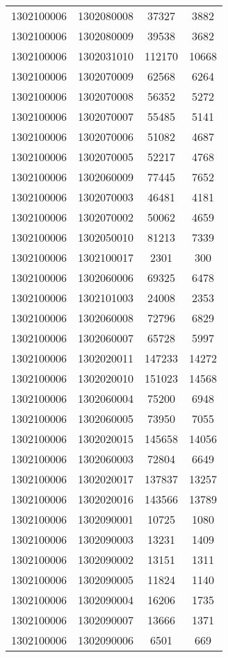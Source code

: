 \begin{longtable}{llcc}
1302100006 & 1302080008 & 37327 & 3882\\
1302100006 & 1302080009 & 39538 & 3682\\
1302100006 & 1302031010 & 112170 & 10668\\
1302100006 & 1302070009 & 62568 & 6264\\
1302100006 & 1302070008 & 56352 & 5272\\
1302100006 & 1302070007 & 55485 & 5141\\
1302100006 & 1302070006 & 51082 & 4687\\
1302100006 & 1302070005 & 52217 & 4768\\
1302100006 & 1302060009 & 77445 & 7652\\
1302100006 & 1302070003 & 46481 & 4181\\
1302100006 & 1302070002 & 50062 & 4659\\
1302100006 & 1302050010 & 81213 & 7339\\
1302100006 & 1302100017 & 2301 & 300\\
1302100006 & 1302060006 & 69325 & 6478\\
1302100006 & 1302101003 & 24008 & 2353\\
1302100006 & 1302060008 & 72796 & 6829\\
1302100006 & 1302060007 & 65728 & 5997\\
1302100006 & 1302020011 & 147233 & 14272\\
1302100006 & 1302020010 & 151023 & 14568\\
1302100006 & 1302060004 & 75200 & 6948\\
1302100006 & 1302060005 & 73950 & 7055\\
1302100006 & 1302020015 & 145658 & 14056\\
1302100006 & 1302060003 & 72804 & 6649\\
1302100006 & 1302020017 & 137837 & 13257\\
1302100006 & 1302020016 & 143566 & 13789\\
1302100006 & 1302090001 & 10725 & 1080\\
1302100006 & 1302090003 & 13231 & 1409\\
1302100006 & 1302090002 & 13151 & 1311\\
1302100006 & 1302090005 & 11824 & 1140\\
1302100006 & 1302090004 & 16206 & 1735\\
1302100006 & 1302090007 & 13666 & 1371\\
1302100006 & 1302090006 & 6501 & 669\\

\end{longtable}
